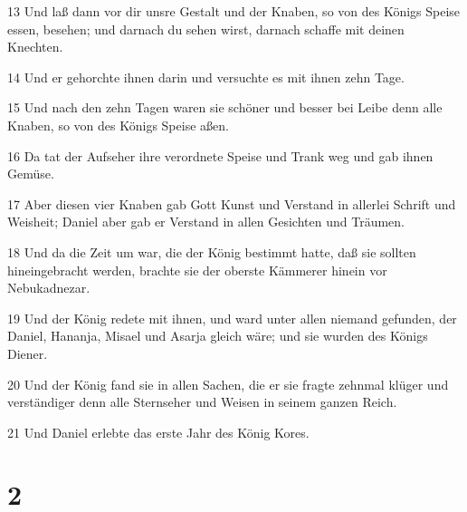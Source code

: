 \par 13 Und laß dann vor dir unsre Gestalt und der Knaben, so von des Königs Speise essen, besehen; und darnach du sehen wirst, darnach schaffe mit deinen Knechten.
\par 14 Und er gehorchte ihnen darin und versuchte es mit ihnen zehn Tage.
\par 15 Und nach den zehn Tagen waren sie schöner und besser bei Leibe denn alle Knaben, so von des Königs Speise aßen.
\par 16 Da tat der Aufseher ihre verordnete Speise und Trank weg und gab ihnen Gemüse.
\par 17 Aber diesen vier Knaben gab Gott Kunst und Verstand in allerlei Schrift und Weisheit; Daniel aber gab er Verstand in allen Gesichten und Träumen.
\par 18 Und da die Zeit um war, die der König bestimmt hatte, daß sie sollten hineingebracht werden, brachte sie der oberste Kämmerer hinein vor Nebukadnezar.
\par 19 Und der König redete mit ihnen, und ward unter allen niemand gefunden, der Daniel, Hananja, Misael und Asarja gleich wäre; und sie wurden des Königs Diener.
\par 20 Und der König fand sie in allen Sachen, die er sie fragte zehnmal klüger und verständiger denn alle Sternseher und Weisen in seinem ganzen Reich.
\par 21 Und Daniel erlebte das erste Jahr des König Kores.

\chapter{2}

